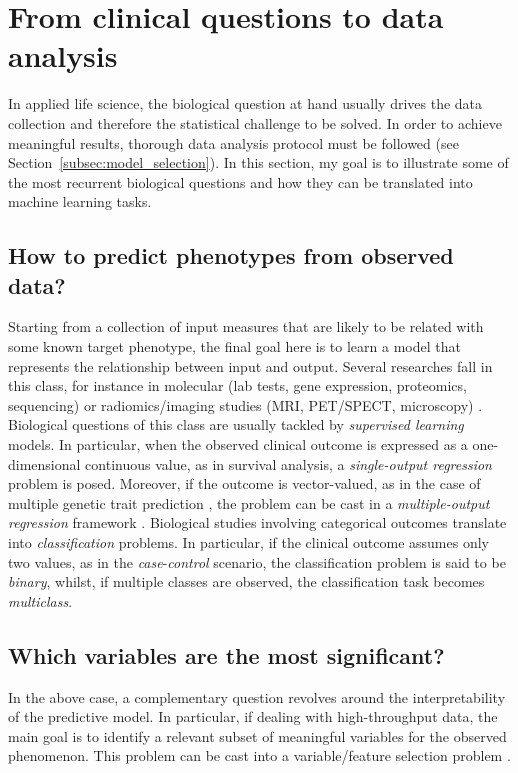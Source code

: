 \section{From clinical questions to data analysis} \label{sec:clinical_to_data}
In applied life science, the biological question at hand usually drives the data collection and therefore the statistical challenge to be solved. In order to achieve meaningful results, thorough data analysis protocol must be followed (see Section~\ref{subsec:model_selection}).
In this section, my goal is to illustrate some of the most recurrent biological questions and how they can be translated into machine learning tasks.


\subsection{How to predict phenotypes from observed data?} %
Starting from a collection of input measures that are likely to be related with some known target phenotype, the final goal here is to learn a model that represents the relationship between input and output. Several researches fall in this class, for instance in molecular (\eg lab tests, gene expression, proteomics, sequencing) \cite{angermueller2016deep, okser2014regularized, abraham2013performance} or radiomics/imaging studies (\eg \ac{MRI}, \ac{PET}/\ac{SPECT}, microscopy) \cite{min2016deep, helmstaedter2013connectomic}. Biological questions of this class are usually tackled by \textit{supervised learning} models. In particular, when the observed clinical outcome is expressed as a one-dimensional continuous value, as in survival analysis, a \textit{single-output regression} problem is posed. Moreover, if the outcome is vector-valued, as in the case of multiple genetic trait prediction \cite{he2016novel}, the problem can be cast in a \textit{multiple-output regression }framework \cite{argyriou2008convex, baldassarre2012multi}. Biological studies involving categorical outcomes translate into \textit{classification} problems. In particular, if the clinical outcome assumes only two values, as in the \textit{case}-\textit{control} scenario, the classification problem is said to be \textit{binary}, whilst, if multiple classes are observed, the classification task becomes \textit{multiclass}.

\subsection{Which variables are the most significant?} %
In the above case, a complementary question revolves around the interpretability of the predictive model. In particular, if dealing with high-throughput data, the main goal is to identify a relevant subset of meaningful variables for the observed phenomenon. This problem can be cast into a variable/feature selection problem \cite{guyon2002gene}. %

